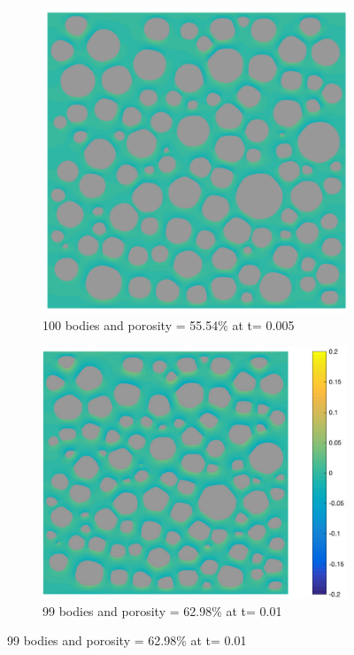 \documentclass[preprint, 10pt]{elsarticle}
\begin{document}
\begin{figure}[H]
 \begin{subfigure}[b]{0.5\textwidth}
\includegraphics*[width =0.9\linewidth]{./figs/100b_50}
\caption{100 bodies and porosity = 55.54\% at t= 0.005}
\end{subfigure}%
\begin{subfigure}[b]{0.5\textwidth}
\includegraphics*[width =1.1\linewidth]{./figs/100b_100}
\caption{99 bodies and porosity = 62.98\% at t= 0.01}

\end{subfigure}
\end{figure}
\end{document}

